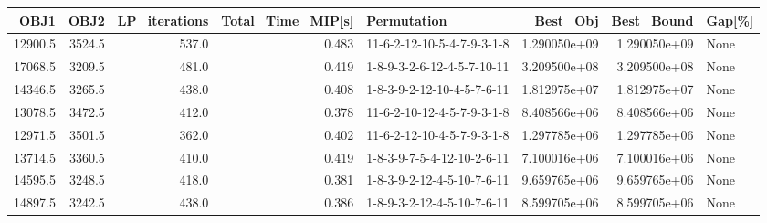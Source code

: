 \begin{tabular}{rrrrlrrl}
\toprule
    OBJ1 &    OBJ2 &  LP\_iterations &  Total\_Time\_MIP[s] &                 Permutation &      Best\_Obj &    Best\_Bound & Gap[\%] \\
\midrule
 12900.5 &  3524.5 &          537.0 &              0.483 &  11-6-2-12-10-5-4-7-9-3-1-8 &  1.290050e+09 &  1.290050e+09 &   None \\
 17068.5 &  3209.5 &          481.0 &              0.419 &  1-8-9-3-2-6-12-4-5-7-10-11 &  3.209500e+08 &  3.209500e+08 &   None \\
 14346.5 &  3265.5 &          438.0 &              0.408 &  1-8-3-9-2-12-10-4-5-7-6-11 &  1.812975e+07 &  1.812975e+07 &   None \\
 13078.5 &  3472.5 &          412.0 &              0.378 &  11-6-2-10-12-4-5-7-9-3-1-8 &  8.408566e+06 &  8.408566e+06 &   None \\
 12971.5 &  3501.5 &          362.0 &              0.402 &  11-6-2-12-10-4-5-7-9-3-1-8 &  1.297785e+06 &  1.297785e+06 &   None \\
 13714.5 &  3360.5 &          410.0 &              0.419 &  1-8-3-9-7-5-4-12-10-2-6-11 &  7.100016e+06 &  7.100016e+06 &   None \\
 14595.5 &  3248.5 &          418.0 &              0.381 &  1-8-3-9-2-12-4-5-10-7-6-11 &  9.659765e+06 &  9.659765e+06 &   None \\
 14897.5 &  3242.5 &          438.0 &              0.386 &  1-8-9-3-2-12-4-5-10-7-6-11 &  8.599705e+06 &  8.599705e+06 &   None \\
\bottomrule
\end{tabular}
